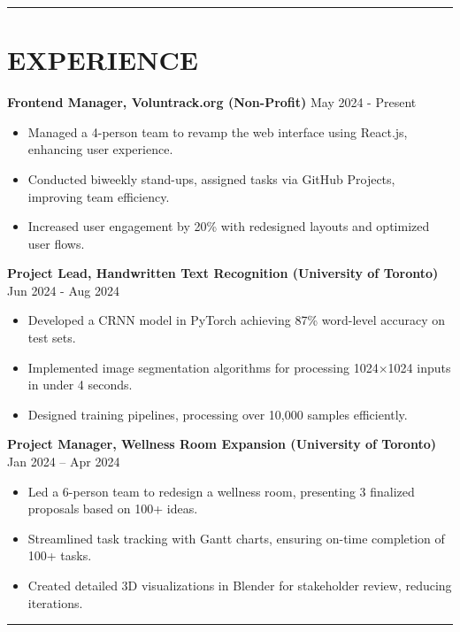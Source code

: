 \documentclass[a4paper,10pt]{article}
\begin{document}
\noindent\rule{\linewidth}{1pt}

\section*{\textbf{EXPERIENCE}}

\textbf{Frontend Manager, Voluntrack.org (Non-Profit)} \hfill May 2024 - Present
\begin{itemize}[leftmargin=0.2in]
    \item Managed a 4-person team to revamp the web interface using React.js, enhancing user experience.
    \item Conducted biweekly stand-ups, assigned tasks via GitHub Projects, improving team efficiency.
    \item Increased user engagement by 20\% with redesigned layouts and optimized user flows.
\end{itemize}

\textbf{Project Lead, Handwritten Text Recognition (University of Toronto)} \hfill Jun 2024 - Aug 2024
\begin{itemize}[leftmargin=0.2in]
    \item Developed a CRNN model in PyTorch achieving 87\% word-level accuracy on test sets.
    \item Implemented image segmentation algorithms for processing 1024$\times$1024 inputs in under 4 seconds.
    \item Designed training pipelines, processing over 10,000 samples efficiently.
\end{itemize}

\textbf{Project Manager, Wellness Room Expansion (University of Toronto)} \hfill Jan 2024 -- Apr 2024
\begin{itemize}[leftmargin=0.2in]
    \item Led a 6-person team to redesign a wellness room, presenting 3 finalized proposals based on 100+ ideas.
    \item Streamlined task tracking with Gantt charts, ensuring on-time completion of 100+ tasks.
    \item Created detailed 3D visualizations in Blender for stakeholder review, reducing iterations.
\end{itemize}

\noindent\rule{\linewidth}{1pt}

\end{document}
